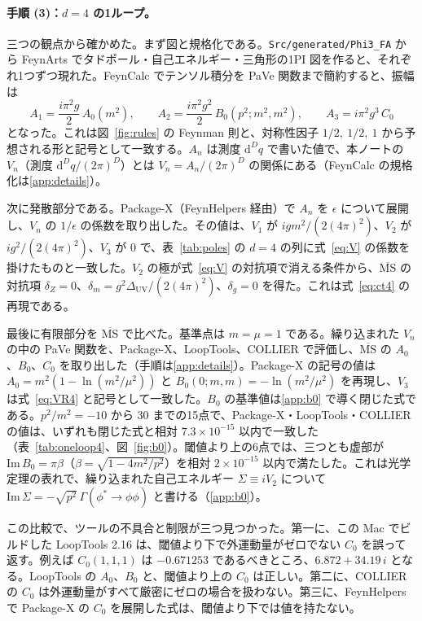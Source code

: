 \documentclass[a4paper,10pt]{ltjsarticle}
\newcommand{\dd}{\mathrm{d}}
\begin{document}
\paragraph{手順 (3)：$d=4$ の1ループ。}三つの観点から確かめた。まず図と規格化である。\texttt{Src/generated/Phi3\_FA} から FeynArts でタドポール・自己エネルギー・三角形の1PI 図を作ると、それぞれ1つずつ現れた。FeynCalc でテンソル積分を PaVe 関数まで簡約すると、振幅は
\begin{equation}
A_1=\frac{i\pi^2g}{2}\,A_0(m^2),\qquad
A_2=\frac{i\pi^2g^2}{2}\,B_0(p^2;m^2,m^2),\qquad
A_3=i\pi^2g^3\,C_0
\label{eq:A123}
\end{equation}
となった。これは図~\ref{fig:rules} の Feynman 則と、対称性因子 $1/2,\ 1/2,\ 1$ から予想される形と記号として一致する。$A_n$ は測度 $\dd^Dq$ で書いた値で、本ノートの $V_n$（測度 $\dd^Dq/(2\pi)^D$）とは $V_n=A_n/(2\pi)^D$ の関係にある（FeynCalc の規格化は\ref{app:details}）。

次に発散部分である。Package-X（FeynHelpers 経由）で $A_n$ を $\epsilon$ について展開し、$V_n$ の $1/\epsilon$ の係数を取り出した。その値は、$V_1$ が $igm^2/(2(4\pi)^2)$、$V_2$ が $ig^2/(2(4\pi)^2)$、$V_3$ が $0$ で、表~\ref{tab:poles} の $d=4$ の列に式~\eqref{eq:V} の係数を掛けたものと一致した。$V_2$ の極が式~\eqref{eq:V} の対抗項で消える条件から、$\overline{\mathrm{MS}}$ の対抗項 $\delta_Z=0$、$\delta_m=g^2\Delta_{\mathrm{UV}}/(2(4\pi)^2)$、$\delta_g=0$ を得た。これは式~\eqref{eq:ct4} の再現である。

最後に有限部分を $\overline{\mathrm{MS}}$ で比べた。基準点は $m=\mu=1$ である。繰り込まれた $V_n$ の中の PaVe 関数を、Package-X、LoopTools、COLLIER で評価し、$\overline{\mathrm{MS}}$ の $A_0$、$B_0$、$C_0$ を取り出した（手順は\ref{app:details}）。Package-X の記号の値は $A_0=m^2(1-\ln(m^2/\mu^2))$ と $B_0(0;m,m)=-\ln(m^2/\mu^2)$ を再現し、$V_3$ は式~\eqref{eq:VR4} と記号として一致した。$B_0$ の基準値は\ref{app:b0} で導く閉じた式である。$p^2/m^2=-10$ から $30$ までの15点で、Package-X・LoopTools・COLLIER の値は、いずれも閉じた式と相対 $7.3\times10^{-15}$ 以内で一致した（表~\ref{tab:oneloop4}、図~\ref{fig:b0}）。閾値より上の6点では、三つとも虚部が $\mathrm{Im}\,B_0=\pi\beta$（$\beta=\sqrt{1-4m^2/p^2}$）を相対 $2\times10^{-15}$ 以内で満たした。これは光学定理の表れで、繰り込まれた自己エネルギー $\Sigma\equiv iV_2$ について $\mathrm{Im}\,\Sigma=-\sqrt{p^2}\,\Gamma(\phi^*\to\phi\phi)$ と書ける（\ref{app:b0}）。

この比較で、ツールの不具合と制限が三つ見つかった。第一に、この Mac でビルドした LoopTools 2.16 は、閾値より下で外運動量がゼロでない $C_0$ を誤って返す。例えば $C_0(1,1,1)$ は $-0.671253$ であるべきところ、$6.872+34.19\,i$ となる。LoopTools の $A_0$、$B_0$ と、閾値より上の $C_0$ は正しい。第二に、COLLIER の $C_0$ は外運動量がすべて厳密にゼロの場合を扱わない。第三に、FeynHelpers で Package-X の $C_0$ を展開した式は、閾値より下では値を持たない。
\end{document}
